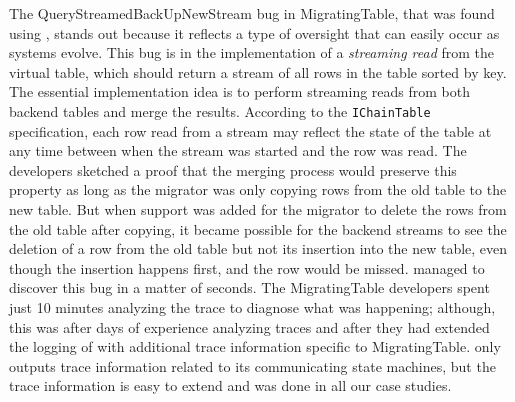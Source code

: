 The QueryStreamedBackUpNewStream bug in MigratingTable, that was found using \psharp, stands out because it reflects a type of oversight that can easily occur as systems evolve. This bug is in the implementation of a \emph{streaming read} from the virtual table, which should return a stream of all rows in the table sorted by key. The essential implementation idea is to perform streaming reads from both backend tables and merge the results. According to the \texttt{IChainTable} specification, each row read from a stream may reflect the state of the table at any time between when the stream was started and the row was read. The developers sketched a proof that the merging process would preserve this property as long as the migrator was only copying rows from the old table to the new table. But when support was added for the migrator to delete the rows from the old table after copying, it became possible for the backend streams to see the deletion of a row from the old table but not its insertion into the new table, even though the insertion happens first, and the row would be missed. \psharp managed to discover this bug in a matter of seconds. The MigratingTable developers spent just 10 minutes analyzing the trace to diagnose what was happening; although, this was after days of experience analyzing traces and after they had extended the logging of \psharp with additional trace information specific to MigratingTable. \psharp only outputs trace information related to its communicating state machines, but the trace information is easy to extend and was done in all our case studies.



